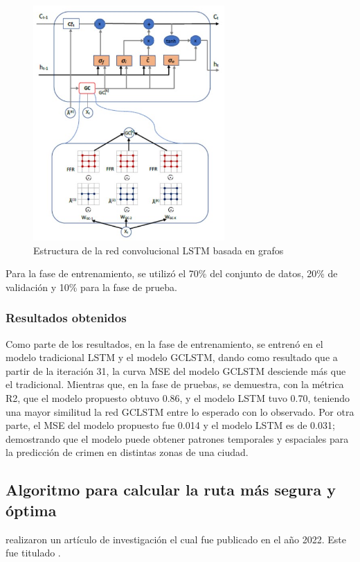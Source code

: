 
\begin{figure}[h]
	\begin{center}
		\includegraphics[width=0.65\textwidth]{2/figures/EsquivelRed.jpg}
		\caption{Estructura de la red convolucional LSTM basada en grafos}
		\label{1:fig2}
	\end{center}
\end{figure}

Para la fase de entrenamiento, se utilizó el 70\% del conjunto de datos, 20\% de validación y 10\% para la fase de prueba.

\subsubsection{Resultados obtenidos}
Como parte de los resultados, en la fase de entrenamiento, se entrenó en el modelo tradicional LSTM y el modelo GCLSTM, dando como resultado que a partir de la iteración 31, la curva MSE del modelo GCLSTM desciende más que el tradicional. 
Mientras que, en la fase de pruebas, se demuestra, con la métrica R2, que el modelo propuesto obtuvo 0.86, y el modelo LSTM tuvo 0.70, teniendo una mayor similitud la red GCLSTM entre lo esperado con lo observado. Por otra parte, el MSE del modelo propuesto fue 0.014 y el modelo LSTM es de 0.031; demostrando que el modelo puede obtener patrones temporales y espaciales para la predicción de crimen en distintas zonas de una ciudad. 

\subsection{Algoritmo para calcular la ruta más segura y óptima \citep*{pr_dehghani2018copper}}
\citeauthor{pr_dehghani2018copper} realizaron un artículo de investigación el cual fue publicado en el año 2022. Este fue titulado .


